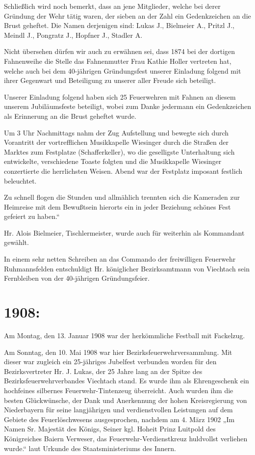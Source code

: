 \documentclass[12pt,a4paper]{book}
\begin{document}
Schließlich wird noch bemerkt, dass an jene Mitglieder, welche bei derer
Gründung der Wehr tätig waren, der sieben an der Zahl ein Gedenkzeichen an die
Brust geheftet. Die Namen derjenigen sind: Lukas J., Bielmeier A., Pritzl J.,
Meindl J., Pongratz J., Hopfner J., Stadler A.

Nicht übersehen dürfen wir auch zu erwähnen sei, dass 1874 bei der dortigen
Fahnenweihe die Stelle das Fahnenmutter Frau Kathie Holler vertreten hat, welche
auch bei dem 40-jährigen Gründungsfest unserer Einladung folgend mit ihrer
Gegenwart und Beteiligung zu unserer aller Freude sich beteiligt.

Unserer Einladung folgend haben sich 25 Feuerwehren mit Fahnen an diesem unserem
Jubiläumsfeste beteiligt, wobei zum Danke jedermann ein Gedenkzeichen als
Erinnerung an die Brust geheftet wurde.

Um 3 Uhr Nachmittags nahm der Zug Aufstellung und bewegte sich durch Vorantritt
der vortrefflichen Musikkapelle Wiesinger durch die Straßen der Marktes zum
Festplatze (Schafferkeller), wo die geselligste Unterhaltung sich entwickelte,
verschiedene Toaste folgten und die Musikkapelle Wiesinger conzertierte die
herrlichsten Weisen. Abend war der Festplatz imposant festlich beleuchtet.

Zu schnell flogen die Stunden und allmählich trennten sich die Kameraden zur
Heimreise mit dem Bewußtsein hierorts ein in jeder Beziehung schönes Fest
gefeiert zu haben.“

Hr. Alois Bielmeier, Tischlermeister, wurde auch für weiterhin als Kommandant
gewählt.

In einem sehr netten Schreiben an das Commando der freiwilligen Feuerwehr
Ruhmannsfelden entschuldigt Hr. königlicher Bezirksamtmann von Viechtach sein
Fernbleiben von der 40-jährigen Gründungsfeier.

\section{1908:}

Am Montag, den 13. Januar 1908 war der herkömmliche Festball mit Fackelzug.

Am Sonntag, den 10. Mai 1908 war hier Bezirksfeuerwehrversammlung. Mit dieser
war zugleich ein 25-jähriges Jubelfest verbunden worden für den Bezirksvertreter
Hr. J. Lukas, der 25 Jahre lang an der Spitze des Bezirksfeuerwehrverbandes
Viechtach stand. Es wurde ihm als Ehrengeschenk ein hochfeines silbernes
Feuerwehr-Tintenzeug überreicht. Auch wurden ihm die besten Glückwünsche, der
Dank und Anerkennung der hohen Kreisregierung von Niederbayern für seine
langjährigen und verdienstvollen Leistungen auf dem Gebiete des Feuerlöschwesens
ausgesprochen, nachdem am 4. März 1902 „Im Namen Sr. Majestät des Königs, Seiner
kgl. Hoheit Prinz Luitpold des Königreiches Baiern Verweser, das
Feuerwehr-Verdienstkreuz huldvollst verliehen wurde.“ laut Urkunde des
Staatsministeriums des Innern.
\end{document}
